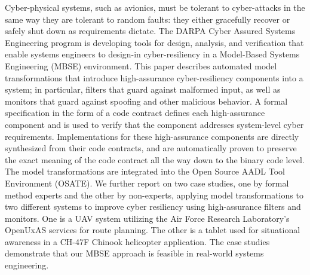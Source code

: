 Cyber-physical systems, such as avionics, must be tolerant to
cyber-attacks in the same way they are tolerant to random faults: they
either gracefully recover or safely shut down as requirements dictate.
The DARPA Cyber Assured Systems Engineering program is developing
tools for design, analysis, and verification that enable systems
engineers to design-in cyber-resiliency in a Model-Based Systems
Engineering (MBSE) environment.  This paper describes automated model
transformations that introduce high-assurance cyber-resiliency
components into a system; in particular, filters that guard against
malformed input, as well as monitors that guard against
spoofing and other malicious behavior.  A formal specification in the
form of a code contract defines each high-assurance component and is
used to verify that the component addresses system-level cyber
requirements.  Implementations for these high-assurance components
are directly synthesized from their code contracts, and are
automatically proven to preserve the exact meaning of the code
contract all the way down to the binary code level.  The model
transformations are integrated into the Open Source AADL 
Tool Environment (OSATE).  We further report on two case
studies, one by formal method experts and the other by non-experts,
applying model transformations to two different systems to improve
cyber resiliency using high-assurance filters and monitors.  One is a
UAV system utilizing the Air Force Research Laboratory's
OpenUxAS services for route planning.  The other is a tablet used for
situational awareness in a CH-47F Chinook helicopter application.
The case studies demonstrate that our MBSE approach is feasible in
real-world systems engineering.